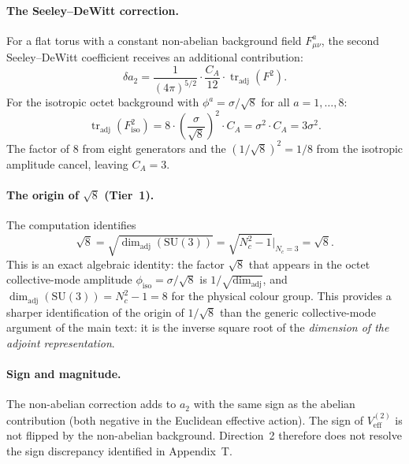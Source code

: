 \paragraph{The Seeley--DeWitt correction.}
For a flat torus with a constant non-abelian background field
$F^a_{\mu\nu}$, the second Seeley--DeWitt coefficient receives an
additional contribution:
\begin{equation}
  \delta a_2 = \frac{1}{(4\pi)^{5/2}}
               \cdot\frac{C_A}{12}
               \cdot \operatorname{tr}_{\mathrm{adj}}(F^2).
\end{equation}
For the isotropic octet background with $\phi^a = \sigma/\sqrt{8}$ for
all $a=1,\ldots,8$:
\begin{equation}
  \operatorname{tr}_{\mathrm{adj}}(F_{\mathrm{iso}}^2)
    = 8\cdot\left(\frac{\sigma}{\sqrt{8}}\right)^2\cdot C_A
    = \sigma^2\cdot C_A = 3\sigma^2.
\end{equation}
The factor of $8$ from eight generators and the $(1/\sqrt{8})^2=1/8$
from the isotropic amplitude cancel, leaving $C_A=3$.

\paragraph{The origin of $\sqrt{8}$ (Tier~1).}
The computation identifies
\begin{equation}
  \label{eq:sqrt8origin}
  \sqrt{8} = \sqrt{\dim_{\mathrm{adj}}(\mathrm{SU}(3))}
           = \sqrt{N_c^2-1}\Big|_{N_c=3}
           = \sqrt{8}.
\end{equation}
This is an exact algebraic identity: the factor $\sqrt{8}$ that
appears in the octet collective-mode amplitude
$\phi_{\mathrm{iso}} = \sigma/\sqrt{8}$ is $1/\sqrt{\dim_{\mathrm{adj}}}$,
and $\dim_{\mathrm{adj}}(\mathrm{SU}(3))=N_c^2-1=8$ for the physical
colour group.  This provides a sharper identification of the origin of
$1/\sqrt{8}$ than the generic collective-mode argument of the main
text: it is the inverse square root of the \emph{dimension of the
adjoint representation}.

\paragraph{Sign and magnitude.}
The non-abelian correction adds to $a_2$ with the same sign as the
abelian contribution (both negative in the Euclidean effective action).
The sign of $V_{\mathrm{eff}}^{(2)}$ is not flipped by the non-abelian
background.  Direction~2 therefore does not resolve the sign
discrepancy identified in Appendix~T.

